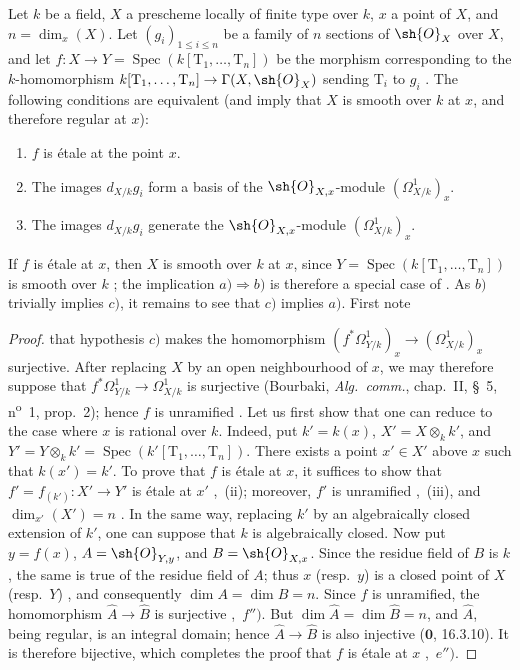 \begin{proposition}[17.15.3]
\label{IV.17.15.3}
Let $k$ be a field, $X$ a prescheme locally of finite type over $k$, $x$ a point of $X$, and $n=\dim_x(X)$.
Let $(g_i)_{1\leq i\leq n}$ be a family of $n$ sections of $\sh{O}_X$ over $X$, and let $f:X\to Y=\operatorname{Spec}(k[\mathrm{T}_1,\ldots,\mathrm{T}_n])$ be the morphism corresponding to the $k$-homomorphism $k[\mathrm{T}_1,\ldots,\mathrm{T}_n]\to\Gamma(X,\sh{O}_X)$ sending $\mathrm{T}_i$ to $g_i$ .
The following conditions are equivalent (and imply that $X$ is smooth over $k$ at $x$, and therefore regular at $x$):
\begin{enumerate}
  \item[a)] $f$ is \'etale at the point $x$.
  \item[b)] The images $d_{X/k}g_i$ form a basis of the $\sh{O}_{X,x}$-module $(\Omega^1_{X/k})_x$.
  \item[c)] The images $d_{X/k}g_i$ generate the $\sh{O}_{X,x}$-module $(\Omega^1_{X/k})_x$.
\end{enumerate}
If $f$ is \'etale at $x$, then $X$ is smooth over $k$ at $x$, since $Y=\operatorname{Spec}(k[\mathrm{T}_1,\ldots,\mathrm{T}_n])$ is smooth over $k$ ; the implication $a)\Rightarrow b)$ is therefore a special case of .
As $b)$ trivially implies $c)$, it remains to see that $c)$ implies $a)$.  First note
\end{proposition}

\begin{proof}
that hypothesis $c)$ makes the homomorphism $(f^*\Omega^1_{Y/k})_x\to(\Omega^1_{X/k})_x$ surjective.  After replacing $X$ by an open neighbourhood of $x$, we may therefore suppose that $f^*\Omega^1_{Y/k}\to\Omega^1_{X/k}$ is surjective (Bourbaki, \emph{Alg.~comm.}, chap.~II, \S~5, n\textsuperscript{o}~1, prop.~2); hence $f$ is unramified .
Let us first show that one can reduce to the case where $x$ is rational over $k$.
Indeed, put $k'=k(x)$, $X'=X\otimes_k k'$, and $Y'=Y\otimes_k k'=\operatorname{Spec}(k'[\mathrm{T}_1,\ldots,\mathrm{T}_n])$.  There exists a point $x'\in X'$ above $x$ such that $k(x')=k'$.
To prove that $f$ is \'etale at $x$, it suffices to show that $f'=f_{(k')}:X'\to Y'$ is \'etale at $x'$ ,~(ii); moreover, $f'$ is unramified ,~(iii), and $\dim_{x'}(X')=n$ .
In the same way, replacing $k'$ by an algebraically closed extension of $k'$, one can suppose that $k$ is algebraically closed.
Now put $y=f(x)$, $A=\sh{O}_{Y,y}$, and $B=\sh{O}_{X,x}$.  Since the residue field of $B$ is $k$, the same is true of the residue field of $A$; thus $x$ (resp.\ $y$) is a closed point of $X$ (resp.\ $Y$) , and consequently $\dim A=\dim B=n$.
Since $f$ is unramified, the homomorphism $\widehat A\to\widehat B$ is surjective ,~$f'')$.  But $\dim\widehat A=\dim\widehat B=n$, and $\widehat A$, being regular, is an integral domain; hence $\widehat A\to\widehat B$ is also injective ($\mathbf{0}$, 16.3.10).  It is therefore bijective, which completes the proof that $f$ is \'etale at $x$ ,~$e'')$.
\end{proof}

